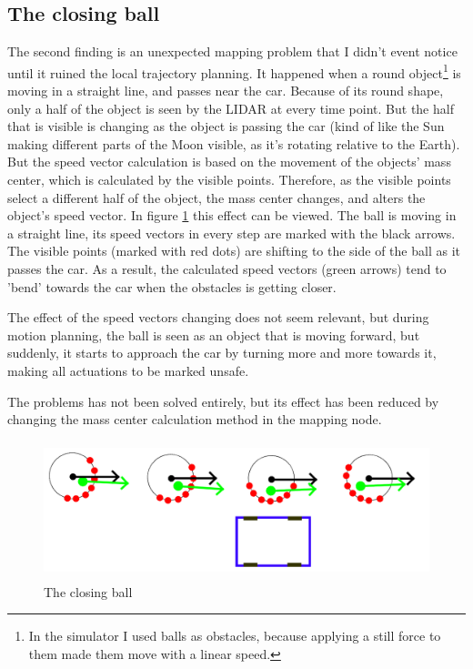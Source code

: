 \subsection{The closing ball}
The second finding is an unexpected mapping problem that I didn't event notice until it ruined the local trajectory planning. It happened when a round object\footnote{In the simulator I used balls as obstacles, because applying a still force to them made them move with a linear speed.} is moving in a straight line, and passes near the car. Because of its round shape, only a half of the object is seen by the LIDAR at every time point. But the half that is visible is changing as the object is passing the car (kind of like the Sun making different parts of the Moon visible, as it's rotating relative to the Earth). But the speed vector calculation is based on the movement of the objects' mass center, which is calculated by the visible points. Therefore, as the visible points select a different half of the object, the mass center changes, and alters the object's speed vector. In figure \ref{closing_ball} this effect can be viewed. The ball is moving in a straight line, its speed vectors in every step are marked with the black arrows. The visible points (marked with red dots) are shifting to the side of the ball as it passes the car. As a result, the calculated speed vectors (green arrows) tend to 'bend' towards the car when the obstacles is getting closer.

The effect of the speed vectors changing does not seem relevant, but during motion planning, the ball is seen as an object that is moving forward, but suddenly, it starts to approach the car by turning more and more towards it, making all actuations to be marked unsafe.

The problems has not been solved entirely, but its effect has been reduced by changing the mass center calculation method in the mapping node.

\begin{figure}[!ht]
    \centering
    \includegraphics[height=40mm]{figures/raw/closing_ball.png}
    \caption{The closing ball}
    \label{closing_ball}
\end{figure} 